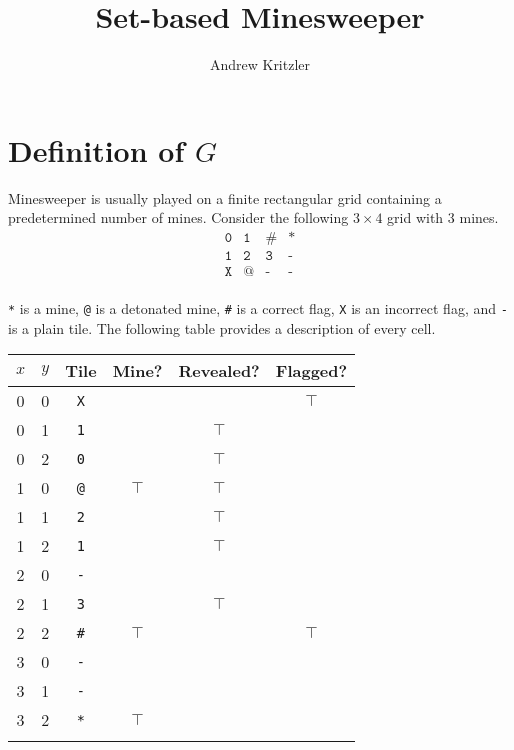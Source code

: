 \documentclass[12pt]{article}
\title{Set-based Minesweeper}
\author{Andrew Kritzler}
\begin{document}
\maketitle
\tableofcontents
\newpage


\section{Definition of \(G\)}

Minesweeper is usually played on a finite rectangular grid containing a predetermined number of mines.
Consider the following \(3 \times 4\) grid with 3 mines.
\[
    \begin{matrix}
        \texttt{0} & \texttt{1} & \texttt{\#} & \texttt{*} \\
        \texttt{1} & \texttt{2} & \texttt{3}  & \texttt{-} \\
        \texttt{X} & \texttt{@} & \texttt{-}  & \texttt{-} \\
    \end{matrix}
\]

\texttt{*} is a mine, \texttt{@} is a detonated mine, \texttt{\#} is a correct flag, \texttt{X} is an incorrect flag, and \texttt{-} is a plain tile.
The following table provides a description of every cell.

\begin{center}
    \begin{tabular}{*{6}{c}}
        \toprule
        \(x\) & \(y\) & Tile        & Mine?     & Revealed? & Flagged?  \\
        \midrule
        0     & 0     & \texttt{X}  &           &           & \(\top \) \\
        0     & 1     & \texttt{1}  &           & \(\top \) &           \\
        0     & 2     & \texttt{0}  &           & \(\top \) &           \\
        1     & 0     & \texttt{@}  & \(\top \) & \(\top \) &           \\
        1     & 1     & \texttt{2}  &           & \(\top \) &           \\
        1     & 2     & \texttt{1}  &           & \(\top \) &           \\
        2     & 0     & \texttt{-}  &           &           &           \\
        2     & 1     & \texttt{3}  &           & \(\top \) &           \\
        2     & 2     & \texttt{\#} & \(\top \) &           & \(\top \) \\
        3     & 0     & \texttt{-}  &           &           &           \\
        3     & 1     & \texttt{-}  &           &           &           \\
        3     & 2     & \texttt{*}  & \(\top \) &           &           \\
        \bottomrule                                                     \\
    \end{tabular}
\end{center}
\end{document}

